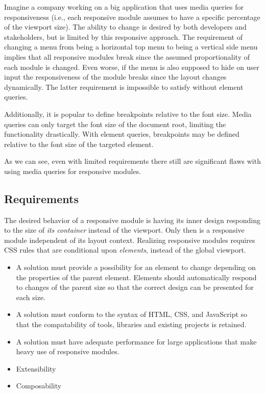 \documentclass{acm_proc_article-sp}
\begin{document}
    Imagine a company working on a big application that uses media queries for responsiveness (i.e., each responsive module assumes to have a specific percentage of the viewport size).
    The ability to change is desired by both developers and stakeholders, but is limited by this responsive approach.
    The requirement of changing a menu from being a horizontal top menu to being a vertical side menu implies that all responsive modules break since the assumed proportionality of each module is changed.
    Even worse, if the menu is also supposed to hide on user input the responsiveness of the module breaks since the layout changes dynamically.
    The latter requirement is impossible to satisfy without element queries.

    Additionally, it is popular to define breakpoints relative to the font size.
    Media queries can only target the font size of the document root, limiting the functionality drastically.
    With element queries, breakpoints may be defined relative to the font size of the targeted element.

    As we can see, even with limited requirements there still are significant flaws with using media queries for responsive modules.

    \label{sec:reqs}
    \subsection{Requirements}

      The desired behavior of a responsive module is having its inner design responding to the size of \emph{its container} instead of the viewport.
      Only then is a responsive module independent of its layout context.
      Realizing responsive modules requires CSS rules that are conditional upon \emph{elements}, instead of the global viewport.

      \begin{itemize}
        \item 
          A solution must provide a possibility for an element to change depending on the properties of the parent element.
          Elements should automatically respond to changes of the parent size so that the correct design can be presented for each size.
        \item
          A solution must conform to the syntax of HTML, CSS, and JavaScript so that the compatability of tools, libraries and existing projects is retained.
        \item
          A solution must have adequate performance for large applications that make heavy use of responsive modules.
        \item Extensibility
        \item Composability
      \end{itemize}
\end{document}
